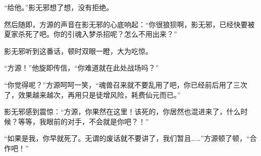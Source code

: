 \begin{this_body}
“给他。”影无邪想了想，没有拒绝。

然后随即，方源的声音在影无邪的心底响起：“你很狼狈啊，影无邪，已经快要被夏家杀死了吧。你的引魂入梦杀招呢？怎么不用出来？”

影无邪听到这番话，顿时双眼一瞪，大为吃惊。

“方源！”他旋即传信，“你难道就在此处战场吗？”

“你觉得呢？”方源呵呵一笑，“魂兽召来就不要乱用了吧，你已经前后用了三次了，效果越来越次，再用只是徒增风险，耗费仙元而已。”

影无邪感到震惊：“方源，你果然在这里！该死的，你居然也混进来了，什么时候？等等，我眼前的对手，不会就是你吧？！”

“如果是我，你早就死了。无谓的废话就不要讲了，我们暂且……”方源顿了顿，“合作吧！”

\end{this_body}

